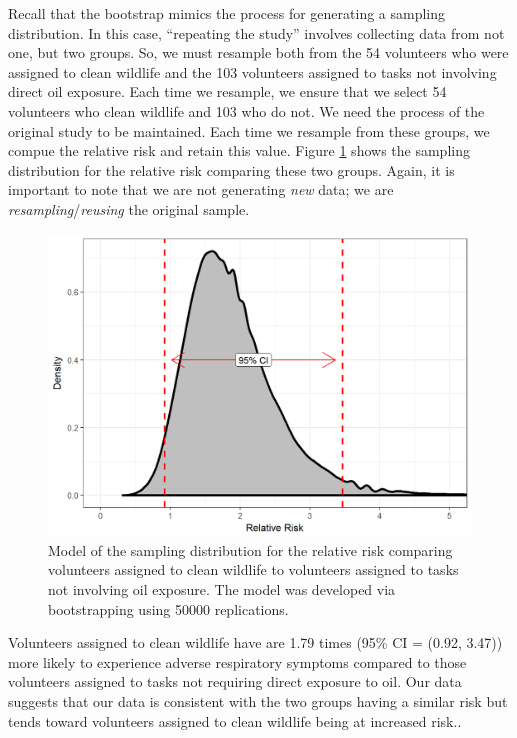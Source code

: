 \documentclass[]{book}
\theoremstyle{definition}
\theoremstyle{definition}
\theoremstyle{definition}
\theoremstyle{remark}
\begin{document}
Recall that the bootstrap mimics the process for generating a sampling
distribution. In this case, ``repeating the study'' involves collecting
data from not one, but two groups. So, we must resample both from the 54
volunteers who were assigned to clean wildlife and the 103 volunteers
assigned to tasks not involving direct oil exposure. Each time we
resample, we ensure that we select 54 volunteers who clean wildlife and
103 who do not. We need the process of the original study to be
maintained. Each time we resample from these groups, we compue the
relative risk and retain this value. Figure
\ref{fig:recaplanguage-sampling-distribution} shows the sampling
distribution for the relative risk comparing these two groups. Again, it
is important to note that we are not generating \emph{new} data; we are
\emph{resampling}/\emph{reusing} the original sample.

\begin{figure}

{\centering \includegraphics[width=0.8\linewidth]{./Images/recaplanguage-sampling-distribution-1} 

}

\caption{Model of the sampling distribution for the relative risk comparing volunteers assigned to clean wildlife to volunteers assigned to tasks not involving oil exposure.  The model was developed via bootstrapping using 50000 replications.}\label{fig:recaplanguage-sampling-distribution}
\end{figure}

Volunteers assigned to clean wildlife have are 1.79 times (95\% CI =
(0.92, 3.47)) more likely to experience adverse respiratory symptoms
compared to those volunteers assigned to tasks not requiring direct
exposure to oil. Our data suggests that our data is consistent with the
two groups having a similar risk but tends toward volunteers assigned to
clean wildlife being at increased risk..
\end{document}
